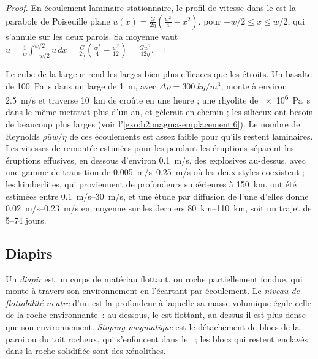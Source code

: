 \begin{proof}
En écoulement laminaire stationnaire, le profil de vitesse dans le  est la parabole
de Poiseuille plane $u(x) = \frac{G}{2\eta}\left(\frac{w^2}{4} - x^2\right)$, pour
$-w/2 \le x \le w/2$, qui s'annule sur les deux parois. Sa moyenne vaut
$\bar u = \frac1w\int_{-w/2}^{w/2}u\,dx = \frac{G}{2\eta}\left(\frac{w^2}{4} -
\frac{w^2}{12}\right) = \frac{Gw^2}{12\eta}$.
\end{proof}

Le cube de la largeur rend les  larges bien plus efficaces que les étroits. Un
basalte de \qty{100}{Pa.s} dans un  large de \qty{1}{m}, avec $\Delta\rho =
\qty{300}{kg/m^3}$, monte à environ \qty{2.5}{m/s} et traverse \qty{10}{km} de
croûte en une heure ; une rhyolite de \qty{e6}{Pa.s} dans le même  mettrait plus
d'un an, et gèlerait en chemin ; les  siliceux ont besoin de  beaucoup plus
larges (voir l'\cref{exo:b2:magma-emplacement:6}). Le nombre de Reynolds $\rho\bar u w/\eta$ de ces écoulements
est assez faible pour qu'ils restent laminaires. Les vitesses de remontée estimées pour les 
pendant les éruptions séparent les éruptions effusives, en dessous d'environ \qty{0.1}{m/s}, des
explosives au-dessus, avec une gamme de transition de \qtyrange{0.005}{0.25}{m/s}
où les deux styles coexistent ; les kimberlites, qui proviennent de
profondeurs supérieures à \qty{150}{km}, ont été estimées entre \qtyrange{0.1}{30}{m/s}, et
une étude par diffusion de l'une d'elles donne \qtyrange{0.02}{0.23}{m/s} en moyenne sur
les derniers \qtyrange{80}{110}{km}, soit un trajet de \numrange{5}{74} jours.

\subsection{Diapirs}

\begin{definition}\label{def:b2:magma-emplacement:ascent}
Un \emph{diapir} est un corps de matériau flottant,  ou roche partiellement fondue, qui
monte à travers son environnement en l'écartant par écoulement. Le
\emph{niveau de flottabilité neutre} d'un  est la
profondeur à laquelle sa masse volumique égale celle de la roche environnante~: au-dessous, le
 est flottant, au-dessus il est plus dense que son environnement. \emph{Stoping
magmatique} est le détachement de blocs de la paroi ou du toit
rocheux, qui s'enfoncent dans le ~; les blocs qui restent enclavés dans la roche
solidifiée sont des xénolithes.
\end{definition}

